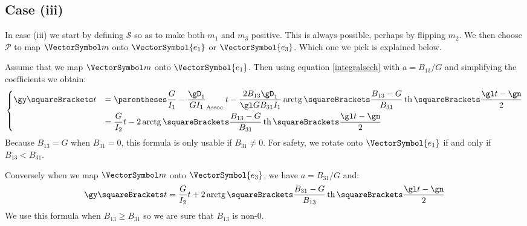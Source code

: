 \documentclass[10pt, a4paper, twoside]{basestyle}
\begin{document}
\subsection*{Case (iii)}
In case (iii) we start by defining $\mathscr S$ so as to make both $m_1$ and $m_3$ positive.  This is always possible, perhaps by flipping $m_2$.  We then
choose $\mathscr P$ to map $\vm$ onto $\VectorSymbol{e_1}$ or $\VectorSymbol{e_3}$.  Which one we pick is explained below.

Assume that we map $\vm$ onto $\VectorSymbol{e_1}$.  Then using equation \ref{integralsech} with $a = B_{13}/G$ and simplifying the coefficients we obtain:
\[
\begin{dcases}
\gy\of{t} &= \pa{\frac{G}{I_1} - \frac{\gD_1}{G I_1}}t - \frac{2 B_{13} \gD_1}{\gl G B_{31} I_1} 
\InverseTrigonometricTangent\of{\frac{B_{13} - G}{B_{31}} \HyperbolicTangent\of{\frac{\gl t - \gn}{2}}} \\
&= \frac{G}{I_2}t - 2 \InverseTrigonometricTangent\of{\frac{B_{13} - G}{B_{31}} \HyperbolicTangent\of{\frac{\gl t - \gn}{2}}}
\end{dcases}
\]
Because $B_{13} = G$ when $B_{31} = 0$, this formula is only usable if $B_{31} \neq 0$.  For safety, we rotate onto $\VectorSymbol{e_1}$ 
if and only if $B_{13} < B_{31}$.

Conversely when we map $\vm$ onto $\VectorSymbol{e_3}$, we have $a = B_{31}/G$ and:
\[
\gy\of{t} = \frac{G}{I_2}t + 2 \InverseTrigonometricTangent\of{\frac{B_{31} - G}{B_{13}} \HyperbolicTangent\of{\frac{\gl t - \gn}{2}}}
\]
We use this formula when $B_{13} \geq B_{31}$ so we are sure that $B_{13}$ is non-$0$.

\printbibliography
\end{document}
